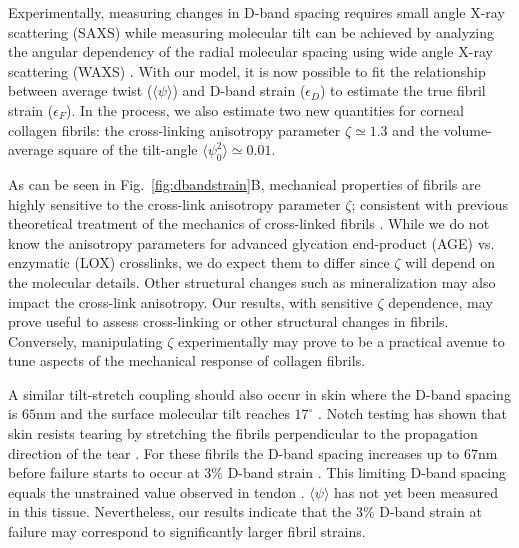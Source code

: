 \documentclass[preprint,12pt]{elsarticle}
\begin{document}
Experimentally, measuring changes in D-band spacing requires small angle X-ray scattering \cite{Sasaki:1996, Gautieri:2017} (SAXS) while measuring molecular tilt can be achieved by analyzing the angular dependency of the radial molecular spacing using wide angle X-ray scattering (WAXS) \cite{Bell:2018}. With our model, it is now possible to fit the relationship between average twist ($\langle \psi \rangle$) and D-band strain ($\epsilon_D$) to estimate the true fibril strain ($\epsilon_F$). In the process, we also estimate two new quantities for corneal collagen fibrils: the cross-linking anisotropy parameter $\zeta \simeq 1.3$ and the volume-average square of the tilt-angle $\langle \psi_0^2 \rangle \simeq 0.01$. 

As can be seen in Fig.~\ref{fig:dbandstrain}B, mechanical properties of fibrils are highly sensitive to the cross-link anisotropy parameter $\zeta$; consistent with previous theoretical treatment of the mechanics of cross-linked fibrils \cite{Leighton:2021b}. While we do not know the anisotropy parameters for advanced glycation end-product (AGE) vs. enzymatic (LOX) crosslinks, we do expect them to differ since $\zeta$ will depend on the molecular details. Other structural changes such as mineralization may also impact the cross-link anisotropy.  Our results, with sensitive $\zeta$ dependence, may prove useful to assess cross-linking or other structural changes in fibrils. Conversely, manipulating $\zeta$ experimentally may prove to be a practical avenue to tune aspects of the mechanical response of collagen fibrils.

A similar tilt-stretch coupling should also occur in skin where the D-band spacing is $65\mathrm{nm}$ \cite{Brodsky:1980} and the surface molecular tilt reaches $17^\circ$ \cite{Ottani:2001, Mechanic:1987}. Notch testing has shown that skin resists tearing by stretching the fibrils perpendicular to the propagation direction of the tear \cite{Yang:2015}. For these fibrils the D-band spacing increases up to $67\mathrm{nm}$ before failure starts to occur at $3\%$ D-band strain \cite{Yang:2015}. This limiting D-band spacing equals the unstrained value observed in tendon \cite{Quan:2015}.  $\langle \psi \rangle$ has not yet been measured in this tissue. Nevertheless, our results indicate that the $3\%$ D-band strain at failure may correspond to significantly larger fibril strains. 
\end{document}

